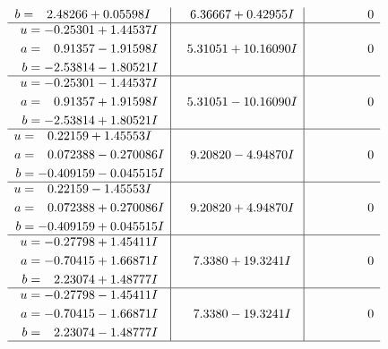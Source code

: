 \documentclass[1p]{elsarticle_modified}
\theoremstyle{definition}
\begin{document}
$$\begin{array}{c|c|c}
\begin{aligned}
b &= \phantom{-}2.48266 + 0.05598 I\end{aligned}
 & \phantom{-}6.36667 + 0.42955 I & \phantom{-0.000000 } 0 \\ \hline\begin{aligned}
u &= -0.25301 + 1.44537 I \\
a &= \phantom{-}0.91357 - 1.91598 I \\
b &= -2.53814 - 1.80521 I\end{aligned}
 & \phantom{-}5.31051 + 10.16090 I & \phantom{-0.000000 } 0 \\ \hline\begin{aligned}
u &= -0.25301 - 1.44537 I \\
a &= \phantom{-}0.91357 + 1.91598 I \\
b &= -2.53814 + 1.80521 I\end{aligned}
 & \phantom{-}5.31051 - 10.16090 I & \phantom{-0.000000 } 0 \\ \hline\begin{aligned}
u &= \phantom{-}0.22159 + 1.45553 I \\
a &= \phantom{-}0.072388 - 0.270086 I \\
b &= -0.409159 - 0.045515 I\end{aligned}
 & \phantom{-}9.20820 - 4.94870 I & \phantom{-0.000000 } 0 \\ \hline\begin{aligned}
u &= \phantom{-}0.22159 - 1.45553 I \\
a &= \phantom{-}0.072388 + 0.270086 I \\
b &= -0.409159 + 0.045515 I\end{aligned}
 & \phantom{-}9.20820 + 4.94870 I & \phantom{-0.000000 } 0 \\ \hline\begin{aligned}
u &= -0.27798 + 1.45411 I \\
a &= -0.70415 + 1.66871 I \\
b &= \phantom{-}2.23074 + 1.48777 I\end{aligned}
 & \phantom{-}7.3380 + 19.3241 I & \phantom{-0.000000 } 0 \\ \hline\begin{aligned}
u &= -0.27798 - 1.45411 I \\
a &= -0.70415 - 1.66871 I \\
b &= \phantom{-}2.23074 - 1.48777 I\end{aligned}
 & \phantom{-}7.3380 - 19.3241 I & \phantom{-0.000000 } 0\\
 \hline 
 \end{array}$$\newpage$$\begin{array}{c|c|c}  

\end{array}$$
\end{document}
